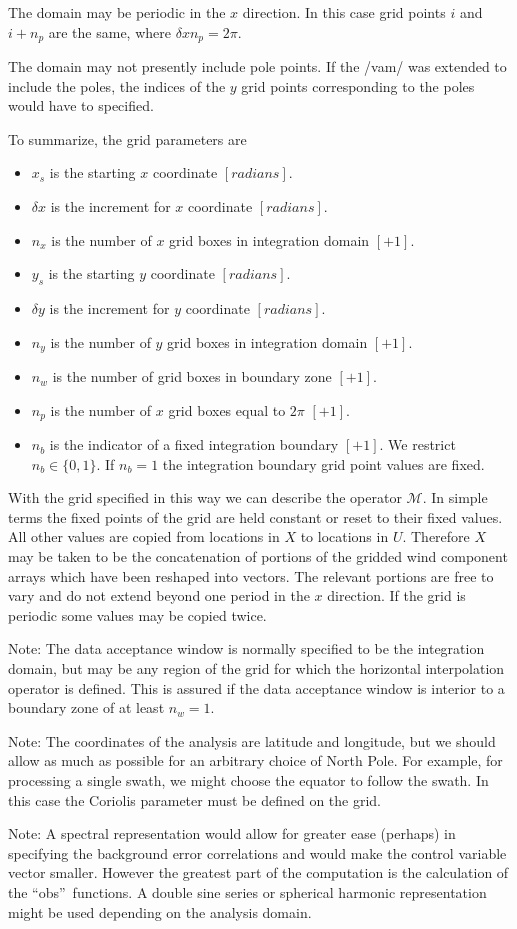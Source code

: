 \documentclass[11pt]{article}
\newcommand{\obs}{``obs''}
\newcommand{\Vector}[1]{\mbox{\boldmath ${#1}$}}
\newcommand{\vardef}[3]{\item $ {#1} $ is the {#2} $ [{#3}] $. }
\newcommand{\Operator}[1]{\mbox{$ \mathcal #1 $}}
\begin{document}
The domain may be periodic in the $x$ direction.  In this case grid
points $i$ and $i+n_p$ are the same, where $\delta x n_p = 2 \pi$.

The domain may not presently include pole points.  If the /vam/ was
extended to include the poles, the indices of the $y$ grid points
corresponding to the poles would have to specified.

To summarize, the grid parameters are
 \begin{itemize}
  \vardef{x_s}{starting $x$ coordinate}{radians}
  \vardef{\delta x}{increment for $x$ coordinate}{radians}
  \vardef{n_x}{number of $x$ grid boxes in integration domain}{+1}
  \vardef{y_s}{starting $y$ coordinate}{radians}
  \vardef{\delta y}{increment for $y$ coordinate}{radians}
  \vardef{n_y}{number of $y$ grid boxes in integration domain}{+1}
  \vardef{n_w}{number of grid boxes in boundary zone}{+1}
  \vardef{n_p}{number of $x$ grid boxes equal to $2\pi$}{+1}
  \vardef{n_b}{indicator of a fixed integration boundary}{+1}
   We restrict $n_b \in \{0,1\}$. If $n_b = 1$ the integration
boundary grid point values are fixed.
 \end{itemize} 

With the grid specified in this way we can describe the operator
\Operator{M}.  In simple terms the fixed points of the grid are held
constant or reset to their fixed values.  All other values are copied
from locations in \Vector{X} to locations in \Vector{U}.  Therefore
\Vector{X} may be taken to be the concatenation of portions of the
gridded wind component arrays which have been reshaped into vectors.
The relevant portions are free to vary and do not extend beyond one
period in the $x$ direction.  If the grid is periodic some values may
be copied twice.

Note: The data acceptance window is normally specified to be the
integration domain, but may be any region of the grid for which the
horizontal interpolation operator is defined.  This is assured if the
data acceptance window is interior to a boundary zone of at least $n_w
= 1$.

Note: The coordinates of the analysis are latitude and longitude, but
we should allow as much as possible for an arbitrary choice of North
Pole.  For example, for processing a single swath, we might choose the
equator to follow the swath.  In this case the Coriolis parameter must
be defined on the grid.

Note: A spectral representation would allow for greater ease (perhaps)
in specifying the background error correlations and would make the
control variable vector smaller.  However the greatest part of the
computation is the calculation of the \obs\ functions.
A double sine series or spherical harmonic representation might be
used depending on the analysis domain.
\end{document}
